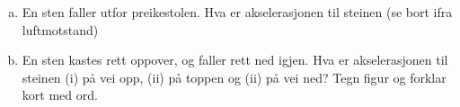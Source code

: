 %
\begin{enumerate}[a)]
    \item En sten faller utfor preikestolen. Hva er akselerasjonen til steinen (se bort ifra luftmotstand)
    \item En sten kastes rett oppover, og faller rett ned igjen. Hva er akselerasjonen til steinen (i) på vei opp, (ii) på toppen og (ii) på vei ned? Tegn figur og forklar kort med ord. 
\end{enumerate}

